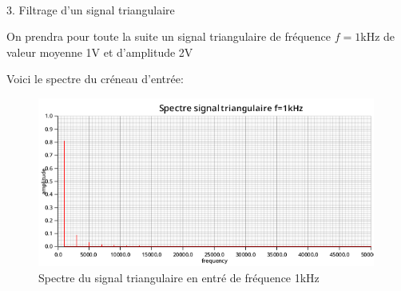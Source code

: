 \documentclass{article}
\newcommand{\expart}[1]
{
    \begin{largeUnderline}#1\end{largeUnderline}\par
}
\begin{document}
\pagebreak
 
\expart{3. Filtrage d'un signal triangulaire} 

On prendra pour toute la suite un signal triangulaire de fréquence $f=1$kHz de valeur moyenne 1V et d'amplitude 2V

Voici le spectre du créneau d'entrée:

\begin{figure}[H]
  \centering
  \includegraphics[height=15em]{images/triangulaire/fft_in.png}
  \caption{Spectre du signal triangulaire en entré de fréquence 1kHz}
\end{figure}
\end{document}
